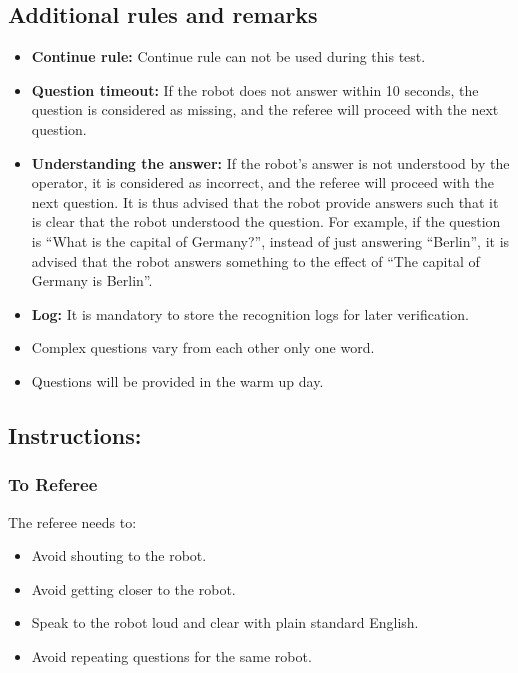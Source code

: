 \subsection*{Additional rules and remarks}
\begin{itemize}[nosep]
	\item \textbf{Continue rule:} Continue rule can not be used during this test.
	\item \textbf{Question timeout:} If the robot does not answer within 10 seconds, the question is considered as missing, and the referee will proceed with the next question.
	\item \textbf{Understanding the answer:} If the robot’s answer is not understood by the operator, it is considered as incorrect, and the referee will proceed with the next question. It is thus advised that the robot provide answers such that it is clear that the robot understood the question. For example, if the question is “What is the capital of Germany?”, instead of just answering “Berlin”, it is advised that the robot answers something to the effect of “The capital of Germany is Berlin”.
	\item \textbf{Log:} It is mandatory to store the recognition logs for later verification.
	\item Complex questions vary from each other only one word.
	\item Questions will be provided in the warm up day.
\end{itemize}

\subsection*{Instructions:}
\subsubsection*{To Referee}

The referee needs to:
\begin{itemize}
	\item Avoid shouting to the robot.
	\item Avoid getting closer to the robot.
	\item Speak to the robot loud and clear with plain standard English.
	\item Avoid repeating questions for the same robot. 
\end{itemize}

